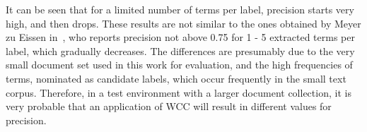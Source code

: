 It can be seen that for a limited number of terms per label, precision starts very high, and then drops. These results are not similar to the ones obtained by Meyer zu Eissen in~\cite{eissen_phd_2007}, who reports precision not above 0.75 for 1 - 5 extracted terms per label, which gradually decreases. The differences are presumably due to the very small document set used in this work for evaluation, and the high frequencies of terms, nominated as candidate labels, which occur frequently in the small text corpus. Therefore, in a test environment with a larger document collection, it is very probable that an application of \gls{WCC} will result in different values for precision.

